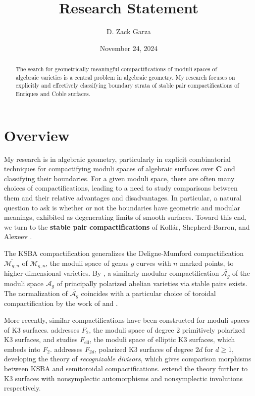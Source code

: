 \documentclass{amsart}
\title{Research Statement}
\date{November 24, 2024}
\author{D. Zack Garza}
\begin{document}
\begin{abstract}
The search for geometrically meaningful compactifications of moduli spaces of algebraic varieties is a central problem in algebraic geometry. My research focuses on explicitly and effectively classifying boundary strata of stable pair compactifications of Enriques and Coble surfaces.
\end{abstract}

\maketitle

\tableofcontents

\section{Overview}\label{overview}

My research is in algebraic geometry, particularly in explicit combinatorial techniques for compactifying moduli spaces of algebraic surfaces over \({\mathbf{C}}\) and classifying their boundaries. For a given moduli space, there are often many choices of compactifications, leading to a need to study comparisons between them and their relative advantages and disadvantages. In particular, a natural question to ask is whether or not the boundaries have geometric and modular meanings, exhibited as degenerating limits of smooth surfaces. Toward this end, we turn to the \textbf{stable pair compactifications} of Kollár, Shepherd-Barron, and Alexeev \cite{kollar1988threefolds-and-deformations,alexeev1996moduli-spaces,Kol23}.

The KSBA compactification generalizes the Deligne-Mumford compactification \(\overline{{ \mathcal{M}_{g, n} }}\) \cite{deligne1969the-irreducibility-of-the-space} of \({ \mathcal{M}_{g, n} }\), the moduli space of genus \(g\) curves with \(n\) marked points, to higher-dimensional varieties. By \cite{mumford1965git, namikawa1976a-new-compactification-of-the-siegel1, alexeev1999on-mumfords-construction, alexeev2002complete-moduli}, a similarly modular compactification \(\overline{{\mathcal{A}_g}}\) of the moduli space \({\mathcal{A}_g}\) of principally polarized abelian varieties via stable pairs exists. The normalization of \(\overline{{\mathcal{A}_g}}\) coincides with a particular choice of toroidal \cite{AMRT75} compactification by the work of \cite{kollar1988threefolds-and-deformations} and \cite{alexeev1996moduli-spaces}.

More recently, similar compactifications have been constructed for moduli spaces of K3 surfaces. \cite{alexeev2023stable-pair} addresses \(F_2\), the moduli space of degree 2 primitively polarized K3 surfaces, and \cite{ABE22} studies \(F_{\mathrm{ell}}\), the moduli space of elliptic K3 surfaces, which embeds into \(F_2\). \cite{alexeevCompactModuliK32023} addresses \(F_{2d}\), polarized K3 surfaces of degree \(2d\) for \(d\geq 1\), developing the theory of \emph{recognizable divisors}, which gives comparison morphisms between KSBA and semitoroidal compactifications. \cite{AEH21, AE22} extend the theory further to K3 surfaces with nonsymplectic automorphisms and nonsymplectic involutions respectively.
\end{document}
